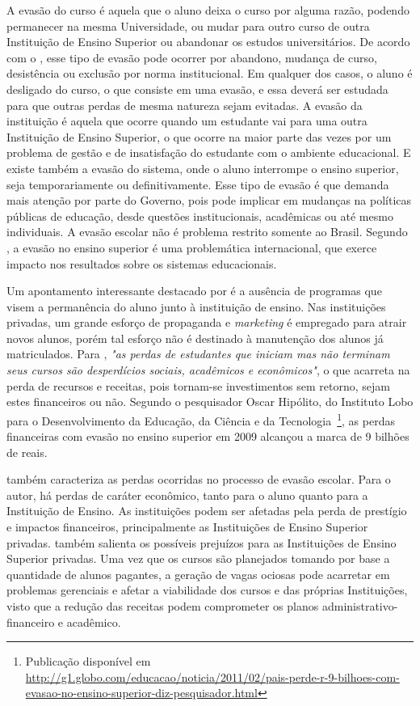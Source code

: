 A evasão do curso é aquela que o aluno deixa o curso por alguma razão, podendo permanecer na mesma Universidade, ou mudar para outro curso de outra Instituição de Ensino Superior ou abandonar os estudos universitários. De acordo com o \citet{mec_1997}, esse tipo de evasão pode ocorrer por abandono, mudança de curso, desistência ou exclusão por norma institucional. Em qualquer dos casos, o aluno é desligado do curso, o que consiste em uma evasão, e essa deverá ser estudada para que outras perdas de mesma natureza sejam evitadas. A evasão da instituição é aquela que ocorre quando um estudante vai para uma outra Instituição de Ensino Superior, o que ocorre na maior parte das vezes por um problema de gestão e de insatisfação do estudante com o ambiente educacional. E existe também a evasão do sistema, onde o aluno interrompe o ensino superior, seja temporariamente ou definitivamente. Esse tipo de evasão é que demanda mais atenção por parte do Governo, pois pode implicar em mudanças na políticas públicas de educação, desde questões institucionais, acadêmicas ou até mesmo individuais. A evasão escolar não é problema restrito somente ao Brasil. Segundo \citet{silvafilho2007}, a evasão no ensino superior é uma problemática internacional, que exerce impacto nos resultados sobre os sistemas educacionais. 

Um apontamento interessante  destacado por \citet{silvafilho2007} é a ausência de programas que visem a permanência do aluno junto à instituição de ensino. Nas instituições privadas, um grande esforço de propaganda e \textit{marketing} é empregado para atrair novos alunos, porém tal esforço não é destinado à manutenção dos alunos já matriculados. Para \citet[p. 642]{silvafilho2007}, \textit{"as perdas de estudantes que iniciam mas não terminam seus cursos são desperdícios sociais, acadêmicos e econômicos"}, o que acarreta na perda de recursos e receitas, pois tornam-se investimentos sem retorno, sejam estes financeiros ou não. Segundo o pesquisador Oscar Hipólito, do Instituto Lobo para o Desenvolvimento da Educação, da Ciência e da Tecnologia~\footnote{Publicação disponível em \url{http://g1.globo.com/educacao/noticia/2011/02/pais-perde-r-9-bilhoes-com-evasao-no-ensino-superior-diz-pesquisador.html}}, as perdas financeiras com evasão no ensino superior em 2009 alcançou a marca de 9 bilhões de reais.

\citet{tigrinho2008} também caracteriza as perdas ocorridas no processo de evasão escolar. Para o autor, há perdas de caráter econômico, tanto para o aluno quanto para a Instituição de Ensino. As instituições podem ser afetadas pela perda de prestígio e impactos financeiros, principalmente as Instituições de Ensino Superior privadas. \citet{lobo2011} também salienta os possíveis prejuízos para as Instituições de Ensino Superior privadas. Uma vez que os cursos são planejados tomando por base a quantidade de alunos pagantes, a geração de vagas ociosas pode acarretar em problemas gerenciais e afetar a viabilidade dos cursos e das próprias Instituições, visto que a redução das receitas podem comprometer os planos administrativo-financeiro e acadêmico.

